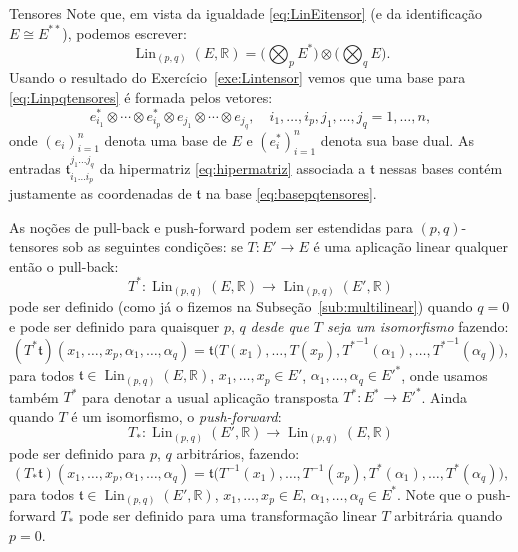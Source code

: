 \documentclass[oneside,11pt]{amsart}
\newcommand{\R}{\mathds R}
\DeclareMathOperator{\Lin}{Lin}
\theoremstyle{remark}\newtheorem{exercise}{Exercício}[section]
\theoremstyle{plain}\newtheorem{teo}{Teorema}[section]
\theoremstyle{plain}\newtheorem{lem}[teo]{Lema}
\theoremstyle{plain}\newtheorem{prop}[teo]{Proposição}
\theoremstyle{definition}\newtheorem{defin}[teo]{Definição}
\theoremstyle{remark}\newtheorem{rem}[teo]{Observação}
\theoremstyle{definition}\newtheorem{example}[teo]{Exemplo}
\numberwithin{equation}{section}
\begin{document}
\begin{section}{Tensores}
Note que, em vista da igualdade \eqref{eq:LinEitensor} (e da identificação $E\cong E^{**}$), podemos escrever:
\begin{equation}\label{eq:Linpqtensores}
\Lin_{(p,q)}(E,\R)=\Big(\bigotimes_pE^*\Big)\otimes\Big(\bigotimes_qE\Big).
\end{equation}
Usando o resultado do Exercício~\ref{exe:Lintensor} vemos que uma base para \eqref{eq:Linpqtensores} é formada pelos vetores:
\begin{equation}\label{eq:basepqtensores}
e_{i_1}^*\otimes\cdots\otimes e_{i_p}^*\otimes e_{j_1}\otimes\cdots\otimes e_{j_q},\quad i_1,\ldots,i_p,j_1,\ldots,j_q=1,\ldots,n,
\end{equation}
onde $(e_i)_{i=1}^n$ denota uma base de $E$ e $(e_i^*)_{i=1}^n$ denota sua base dual. As entradas $\mathfrak t_{i_1\ldots i_p}^{j_1\ldots j_q}$ da hipermatriz
\eqref{eq:hipermatriz} associada a $\mathfrak t$ nessas bases contém justamente as coordenadas de $\mathfrak t$ na base \eqref{eq:basepqtensores}.

As noções de pull-back e push-forward podem ser estendidas para $(p,q)$-tensores sob as seguintes condições: se $T:E'\to E$ é uma aplicação linear qualquer
então o pull-back:
\[T^*:\Lin_{(p,q)}(E,\R)\longrightarrow\Lin_{(p,q)}(E',\R)\]
pode ser definido (como já o fizemos na Subseção~\ref{sub:multilinear})
quando $q=0$ e pode ser definido para quaisquer $p$, $q$ {\em desde que $T$ seja um isomorfismo\/} fazendo:
\[(T^*\mathfrak t)(x_1,\ldots,x_p,\alpha_1,\ldots,\alpha_q)=\mathfrak t\big(T(x_1),\ldots,T(x_p),{T^*}^{-1}(\alpha_1),\ldots,{T^*}^{-1}(\alpha_q)\big),\]
para todos $\mathfrak t\in\Lin_{(p,q)}(E,\R)$,
$x_1,\ldots,x_p\in E'$, $\alpha_1,\ldots,\alpha_q\in{E'}^*$, onde usamos também $T^*$ para denotar a usual aplicação transposta $T^*:E^*\to{E'}^*$.
Ainda quando $T$ é um isomorfismo, o {\em push-forward}:
\[T_*:\Lin_{(p,q)}(E',\R)\longrightarrow\Lin_{(p,q)}(E,\R)\]
pode ser definido para $p$, $q$ arbitrários, fazendo:
\[(T_*\mathfrak t)(x_1,\ldots,x_p,\alpha_1,\ldots,\alpha_q)=\mathfrak t\big(T^{-1}(x_1),\ldots,T^{-1}(x_p),T^*(\alpha_1),\ldots,T^*(\alpha_q)\big),\]
para todos $\mathfrak t\in\Lin_{(p,q)}(E',\R)$,
$x_1,\ldots,x_p\in E$, $\alpha_1,\ldots,\alpha_q\in E^*$. Note que o push-forward $T_*$ pode ser definido para uma transformação linear $T$ arbitrária
quando $p=0$.


\end{section}
\end{document}
